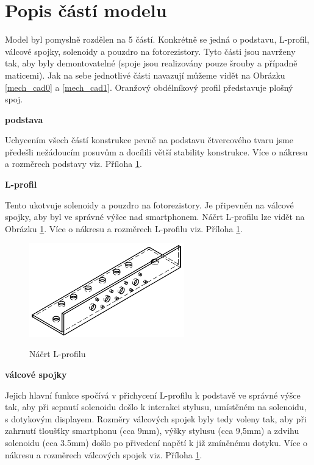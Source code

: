 \documentclass[12pt,oneside]{book} %
\begin{document}
\pagebreak

\section{Popis částí modelu}\label{mech_casti}
\qquad Model byl pomyslně rozdělen na 5 částí. Konkrétně se jedná o podstavu, L-profil, válcové spojky, solenoidy a pouzdro na fotorezistory. Tyto části jsou navrženy tak, aby byly demontovatelné (spoje jsou realizovány pouze šrouby a případně maticemi). Jak na sebe jednotlivé části navazují můžeme vidět na Obrázku \ref{mech_cad0} a \ref{mech_cad1}. Oranžový obdélníkový profil představuje plošný spoj.

\textbf{podstava}

\qquad Uchycením všech částí konstrukce pevně na podstavu čtvercového tvaru jsme předešli nežádoucím posuvům a docílili větší stability konstrukce. Více o nákresu a rozměrech podstavy viz. Příloha \hyperref[Prilohy]{1}.

\textbf{L-profil}

\qquad Tento ukotvuje solenoidy a pouzdro na fotorezistory. Je připevněn na válcové spojky, aby byl ve správné výšce nad smartphonem. Náčrt L-profilu lze vidět na Obrázku \ref{lprof}. Více o nákresu a rozměrech L-profilu viz. Příloha \hyperref[Prilohy]{1}.  

\begin{figure}[h] \large\centering
\includegraphics[width=0.60\textwidth]{./img/lprof.png}\\[1cm] 
\caption{Náčrt L-profilu}
\label{lprof}
\end{figure}   

\textbf{válcové spojky}

\qquad Jejich hlavní funkce spočívá v přichycení L-profilu k podstavě ve správné výšce tak, aby při sepnutí solenoidu došlo k interakci stylusu, umístěném na solenoidu, s dotykovým displayem. Rozměry válcových spojek byly tedy voleny tak, aby při zahrnutí tloušťky smartphonu (cca 9mm), výšky stylusu (cca 9,5mm) a zdvihu solenoidu (cca 3.5mm) došlo po přivedení napětí k již zmíněnému dotyku.  Více o nákresu a rozměrech válcových spojek viz. Příloha \hyperref[Prilohy]{1}.
\end{document}
